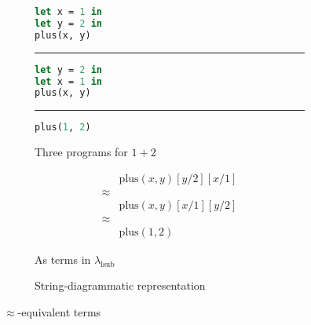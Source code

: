 \begin{figure}
	\centering
	\begin{subfigure}{0.3\linewidth}
		\begin{lstlisting}[language=ML]
let x = 1 in
let y = 2 in
plus(x, y)
                \end{lstlisting}
		\hrule
		\begin{lstlisting}[language=ML]
let y = 2 in
let x = 1 in
plus(x, y)
                \end{lstlisting}
		\hrule
		\begin{lstlisting}[language=ML]
plus(1, 2)
                \end{lstlisting}
		\caption{Three programs for $1 + 2$}%
		\label{fig:plus-1-2-programs}
	\end{subfigure}
	\hspace{2em}
	\begin{subfigure}{0.2\linewidth}
		\begin{align*}
			        & \text{plus}(x, y)[y/2][x/1] \\
			\approx &                             \\
			        & \text{plus}(x, y)[x/1][y/2] \\
			\approx &                             \\
			        & \text{plus}(1, 2)
		\end{align*}
		\caption{As terms in $\lambda_{\text{lsub}}$}%
		\label{fig:plus-1-2-terms}
	\end{subfigure}
	\hspace{2em}
	\begin{subfigure}{0.2\linewidth}
		\centering
		\caption{String-diagrammatic representation}%
		\label{fig:plus-1-2-string-diagram}
	\end{subfigure}
	\caption{$\approx$-equivalent terms}%
	\label{fig:plus-1-2}
\end{figure}

